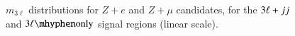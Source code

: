 \begin{appendices}
\begin{figure}[h]
{  }
  \caption{$m_{3\ell}$ distributions for $Z+e$ and $Z+\mu$ candidates, for the $3\ell+jj$ and $\threelo$ signal regions (linear scale).}
  \label{fig:SR-m3l-2-linear}
\end{figure}



\end{appendices}
